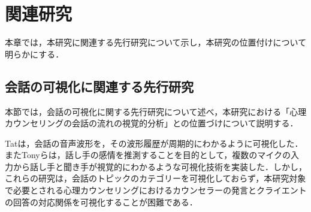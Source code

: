 \documentclass[shuuron]{kuee}
\begin{document}









\chapter{関連研究}%






本章では，本研究に関連する先行研究について示し，本研究の位置付けについて明らかにする．%

\section{会話の可視化に関連する先行研究}

本節では，会話の可視化に関する先行研究について述べ，本研究における「心理カウンセリングの会話の流れの視覚的分析」との位置づけについて説明する．%

Tat\cite{tat2002visualising}は，会話の音声波形を，その波形履歴が周期的にわかるように可視化した．
またTonyら\cite{bergstrom2007seeing}は，話し手の感情を推測することを目的として，複数のマイクの入力から話し手と聞き手が視覚的にわかるような可視化技術を実装した．しかし，これらの研究は，会話のトピックのカテゴリーを可視化しておらず，本研究対象で必要とされる心理カウンセリングにおけるカウンセラーの発言とクライエントの回答の対応関係を可視化することが困難である．
\end{document}

